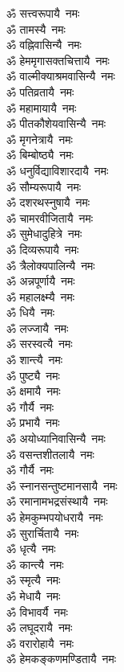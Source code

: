 \begin{multicols}{2}
\begin{flushleft}
ॐ सत्त्वरूपायै~नमः\\
ॐ तामस्यै~नमः\\
ॐ वह्निवासिन्यै~नमः\\
ॐ हेममृगासक्तचित्तायै~नमः\\
ॐ वाल्मीक्याश्रमवासिन्यै~नमः\\
ॐ पतिव्रतायै~नमः\\
ॐ महामायायै~नमः\\
ॐ पीतकौशेयवासिन्यै~नमः\\
ॐ मृगनेत्रायै~नमः\\
ॐ बिम्बोष्ठ्यै~नमः\hfill{}\\
ॐ धनुर्विद्याविशारदायै~नमः\\
ॐ सौम्यरूपायै~नमः\\
ॐ दशरथस्नुषायै~नमः\\
ॐ चामरवीजितायै~नमः\\
ॐ सुमेधादुहित्रे~नमः\\
ॐ दिव्यरूपायै~नमः\\
ॐ त्रैलोक्यपालिन्यै~नमः\\
ॐ अन्नपूर्णायै~नमः\\
ॐ महालक्ष्म्यै~नमः\\
ॐ धियै~नमः\hfill{}\\
ॐ लज्जायै~नमः\\
ॐ सरस्वत्यै~नमः\\
ॐ शान्त्यै~नमः\\
ॐ पुष्ट्यै~नमः\\
ॐ क्षमायै~नमः\\
ॐ गौर्यै~नमः\\
ॐ प्रभायै~नमः\\
ॐ अयोध्यानिवासिन्यै~नमः\\
ॐ वसन्तशीतलायै~नमः\\
ॐ गौर्यै~नमः\hfill{}\\
ॐ स्नानसन्तुष्टमानसायै~नमः\\
ॐ रमानामभद्रसंस्थायै~नमः\\
ॐ हेमकुम्भपयोधरायै~नमः\\
ॐ सुरार्चितायै~नमः\\
ॐ धृत्यै~नमः\\
ॐ कान्त्यै~नमः\\
ॐ स्मृत्यै~नमः\\
ॐ मेधायै~नमः\\
ॐ विभावर्यै~नमः\\
ॐ लघूदरायै~नमः\hfill{}\\
ॐ वरारोहायै~नमः\\
ॐ हेमकङ्कणमण्डितायै~नमः\\

\end{flushleft}
\end{multicols}
